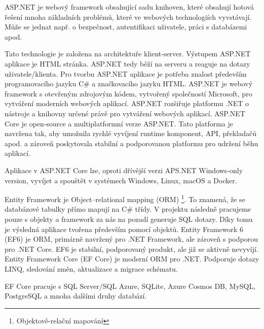 \documentclass[a4paper, 12pt]{report}
\begin{document}
			ASP.NET je webový framework obsahující sadu knihoven, které obsahují hotová řešení mnoha základních problémů, které ve webových technologiích vyvstávají. Může se jednat např. o bezpečnost, autentifikaci uživatele, práci s databázemi apod.\par
			Tato technologie je založena na architektuře klient-server. Výstupem ASP.NET aplikace je HTML stránka. ASP.NET tedy běží na serveru a reaguje na dotazy uživatele/klienta. Pro tvorbu ASP.NET aplikace je potřeba znalost především programovacího jazyku C\# a značkovacího jazyku HTML.\cite{ASP.NET_Lekce1}
				ASP.NET je webový framework s otevřeným zdrojovým kódem, vytvořený společností Microsoft, pro vytváření moderních webových aplikací. ASP.NET rozšiřuje platformu .NET o nástroje a knihovny určené právě pro vytváření webových aplikací.\cite{ASP.NET}
				ASP.NET Core je open-source a multiplatformní verze ASP.NET. Tato platforma je navržena tak, aby umožnila rychlé vyvíjení runtime komponent, API, překladačů apod. a zároveň poskytovala stabilní a podporovanou platformu pro udržení běhu aplikací.\par
				Aplikace v ASP.NET Core lze, oproti dřívější verzi APS.NET Windows-only version, vyvíjet a spouštět v systémech Windows, Linux, macOS a Docker.\cite{ASP.NET_Core}

			Entity Framework je Object–relational mapping (ORM) \footnote{Objektově-relační mapování}. To znamená, že se databázové tabulky přímo mapují na C\# třídy. V projektu následně pracujeme pouze s objekty a framework za nás na pozadí generuje SQL dotazy. Díky tomu je výsledná aplikace tvořena především pomocí objektů.\cite{ASP.NET_Lekce8}
				Entity Framework 6 (EF6) je ORM, primárně navržený pro .NET Framework, ale zároveň s podporou pro .NET Core. EF6 je stabilní, podporovaný produkt, ale již se aktivně nevyvíjí.\cite{EF6_EFCore}
				Entity Framework Core (EF Core) je moderní ORM pro .NET. Podporuje dotazy LINQ, sledování změn, aktualizace a migrace schématu.\par
				EF Core pracuje s SQL Server/SQL Azure, SQLite, Azure Cosmos DB, MySQL, PostgreSQL a mnoha dalšími druhy databází.\cite{EF6_EFCore}
\end{document}
